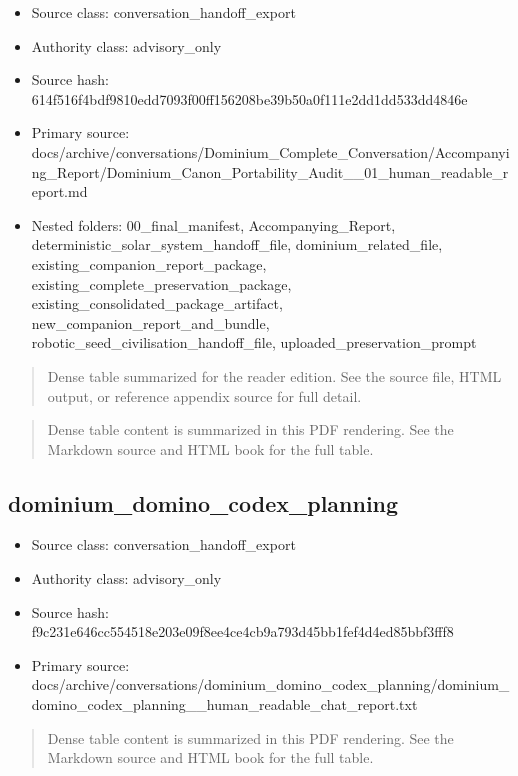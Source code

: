 \documentclass[11pt,a4paper]{report}
\begin{document}
\begin{itemize}
\item Source class: conversation\_handoff\_export
\item Authority class: advisory\_only
\item Source hash: 614f516f4bdf9810edd7093f00ff156208be39b50a0f111e2dd1dd533dd4846e
\item Primary source: docs/archive/conversations/Dominium\_Complete\_Conversation/Accompanying\_Report/Dominium\_Canon\_Portability\_Audit\_\_01\_human\_readable\_report.md
\item Nested folders: 00\_final\_manifest, Accompanying\_Report, deterministic\_solar\_system\_handoff\_file, dominium\_related\_file, existing\_companion\_report\_package, existing\_complete\_preservation\_package, existing\_consolidated\_package\_artifact, new\_companion\_report\_and\_bundle, robotic\_seed\_civilisation\_handoff\_file, uploaded\_preservation\_prompt
\end{itemize}


\begin{quote}\small Dense table summarized for the reader edition. See the source file, HTML output, or reference appendix source for full detail.\end{quote}

\begin{quote}\small Dense table content is summarized in this PDF rendering. See the Markdown source and HTML book for the full table.\end{quote}


\subsection{dominium\_domino\_codex\_planning}

\begin{itemize}
\item Source class: conversation\_handoff\_export
\item Authority class: advisory\_only
\item Source hash: f9c231e646cc554518e203e09f8ee4ce4cb9a793d45bb1fef4d4ed85bbf3fff8
\item Primary source: docs/archive/conversations/dominium\_domino\_codex\_planning/dominium\_domino\_codex\_planning\_\_human\_readable\_chat\_report.txt
\end{itemize}

\begin{quote}\small Dense table content is summarized in this PDF rendering. See the Markdown source and HTML book for the full table.\end{quote}
\end{document}
